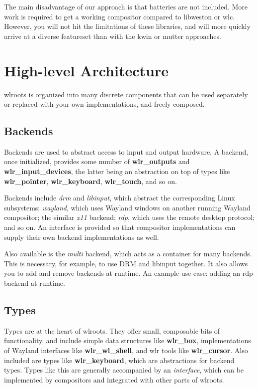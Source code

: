 \documentclass{article}
\begin{document}
The main disadvantage of our approach is that batteries are not included. More
work is required to get a working compositor compared to libweston or wlc.
However, you will not hit the limitations of these libraries, and will more
quickly arrive at a diverse featureset than with the kwin or mutter approaches.

\section{High-level Architecture}\label{highlevel}

wlroots is organized into many discrete components that can be used separately
or replaced with your own implementations, and freely composed.

\subsection{Backends}\label{high level backends}

Backends are used to abstract access to input and output hardware. A backend,
once initialized, provides some number of \textbf{wlr_outputs} and
\textbf{wlr_input_devices}, the latter being an abstraction on top of types
like \textbf{wlr_pointer}, \textbf{wlr_keyboard}, \textbf{wlr_touch}, and so on.

Backends include \emph{drm} and \emph{libinput}, which abstract the
corresponding Linux subsystems; \emph{wayland}, which uses Wayland windows on
another running Wayland compositor; the similar \emph{x11} backend; \emph{rdp},
which uses the remote desktop protocol; and so on. An interface is provided so
that compositor implementations can supply their own backend implementations as
well.

Also available is the \emph{multi} backend, which acts as a container for many
backends. This is necessary, for example, to use DRM and libinput together. It
also allows you to add and remove backends at runtime. An example use-case:
adding an rdp backend at runtime.

\subsection{Types}\label{high level types}

Types are at the heart of wlroots. They offer small, composable bits of
functionality, and include simple data structures like \textbf{wlr_box},
implementations of Wayland interfaces like \textbf{wlr_wl_shell}, and wlr tools
like \textbf{wlr_cursor}. Also included are types like \textbf{wlr_keyboard},
which are abstractions for backend types. Types like this are generally
accompanied by an \emph{interface}, which can be implemented by compositors and
integrated with other parts of wlroots.
\end{document}
